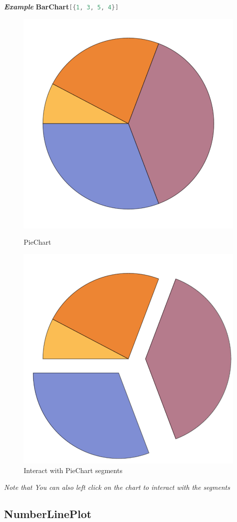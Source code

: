 \documentclass[a4paper]{book}
\begin{document}
\noindent\emph{\textbf{Example}}\quad
\textbf{BarChart}\lstinline[language=Mathematica]|[{1, 3, 5, 4}]|
\begin{figure}[H]
\begin{minipage}{.5\linewidth}
  \centering
  \includegraphics[width=0.7\linewidth]{figures/PieChart}
  \caption{PieChart}
\end{minipage}\begin{minipage}{.5\linewidth}
  \centering
  \includegraphics[width=0.7\linewidth]{figures/PieChart2}
  \caption{Interact with PieChart segments}
\end{minipage}
\end{figure}

\noindent\emph{Note that You can also left click on the chart to interact with the segments}

\subsection{NumberLinePlot}
\label{subsec:label}
\end{document}
